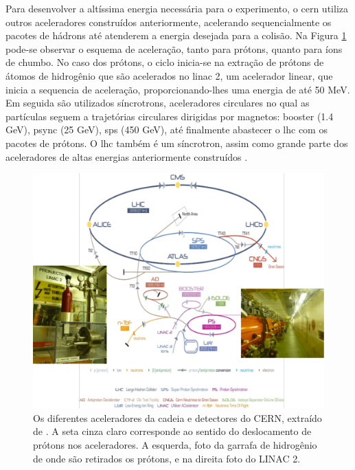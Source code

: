 Para desenvolver a altíssima energia necessária para o experimento, o \gls{cern}
utiliza outros aceleradores construídos anteriormente, acelerando
sequencialmente os pacotes de hádrons até atenderem
a energia desejada para a colisão. Na Figura \ref{fig:esquema_aceleradores} pode-se observar
o esquema de aceleração, tanto para prótons, quanto para íons de chumbo. 
No caso dos prótons, o ciclo inicia-se na extração de prótons de átomos
de hidrogênio que são acelerados no \acrshort{linac} 2, um acelerador linear,
que inicia a sequencia de aceleração, proporcionando-lhes uma energia de até 50 MeV. 
Em seguida são utilizados síncrotrons, aceleradores circulares no qual as
partículas seguem a trajetórias circulares dirigidas por magnetos: \acrshort{booster} (1.4
GeV), \acrshort{psync} (25 GeV), \acrshort{sps} (450 GeV), até finalmente 
abastecer o \gls{lhc} com os pacotes de prótons. O \gls{lhc} também é um
síncrotron, assim como grande parte dos aceleradores de altas energias anteriormente 
construídos \cite{lecture_slides_1,lecture_slides_2}.

\begin{figure}[h!t]
\centering
\includegraphics[width=\textwidth]{imagens/lhc_garrafa_linac2.pdf}
\caption[A cadeia de aceleração do LHC]{
Os diferentes aceleradores da cadeia e detectores do CERN, extraído de
\cite{cern_accelerators}. A seta cinza claro corresponde ao sentido do
deslocamento de prótons nos aceleradores. A esquerda, foto da garrafa
de hidrogênio de onde são retirados os prótons, e na direita foto do LINAC 2.}
\label{fig:esquema_aceleradores}
\end{figure}

